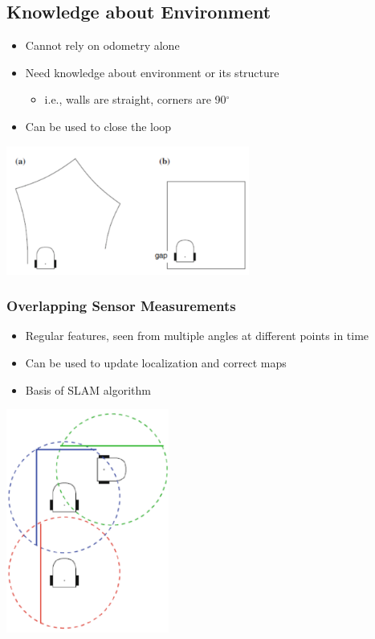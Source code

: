 \documentclass[10pt]{article}
\begin{document}
\subsection*{Knowledge about Environment}
\begin{itemize}
	\item Cannot rely on odometry alone
	\item Need knowledge about environment or its structure
	\begin{itemize}
        \item i.e., walls are straight, corners are 90$^\circ$
    \end{itemize}
    \item Can be used to close the loop
\end{itemize}
\begin{center} 
	\includegraphics*[width=0.6\textwidth]{L2_4.png} 
\end{center}

\subsubsection*{Overlapping Sensor Measurements}
\begin{itemize}
	\item Regular features, seen from multiple angles at different points in time
	\item Can be used to update localization and correct maps
	\item Basis of SLAM algorithm
\end{itemize}
\begin{center} 
	\includegraphics*[width=0.4\textwidth]{L2_5.png} 
\end{center}
\end{document}
